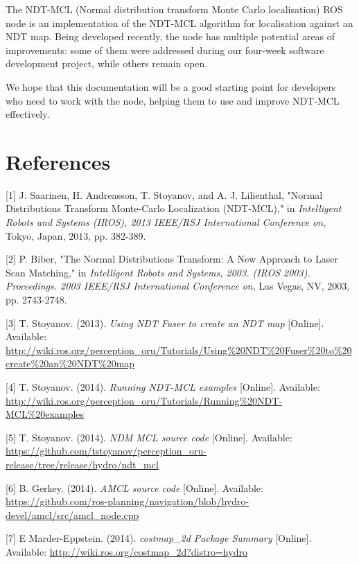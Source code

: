 \documentclass[12pt]{article}
\begin{document}
	The NDT-MCL (Normal distribution transform Monte Carlo localisation) ROS node is an implementation of the NDT-MCL algorithm for localisation against an NDT map. Being developed recently, the node has multiple potential areas of improvements: some of them were addressed during our four-week software development project, while others remain open.

	We hope that this documentation will be a good starting point for developers who need to work with the node, helping them to use and improve NDT-MCL effectively.

	\section{References}
	\label{sec:references}

	[1] J. Saarinen, H. Andreasson, T. Stoyanov, and A. J. Lilienthal, "Normal Distributions Transform Monte-Carlo Localization (NDT-MCL)," in {\it Intelligent Robots and Systems (IROS), 2013 IEEE/RSJ International Conference on}, Tokyo, Japan, 2013, pp. 382-389.

	\setlength{\parskip}{0.25in}

	[2] P. Biber, "The Normal Distributions Transform: A New Approach to Laser Scan Matching," in {\it Intelligent Robots and Systems, 2003. (IROS 2003). Proceedings. 2003 IEEE/RSJ International Conference on}, Las Vegas, NV, 2003, pp. 2743-2748.

	[3] T. Stoyanov. (2013). {\it Using NDT Fuser to create an NDT map} [Online]. Available: \url{http://wiki.ros.org/perception_oru/Tutorials/Using%20NDT%20Fuser%20to%20create%20an%20NDT%20map}

	[4] T. Stoyanov. (2014). {\it Running NDT-MCL examples} [Online]. Available: \url{http://wiki.ros.org/perception_oru/Tutorials/Running%20NDT-MCL%20examples}

	[5] T. Stoyanov. (2014). {\it NDM MCL source code} [Online]. Available: \url{https://github.com/tstoyanov/perception_oru-release/tree/release/hydro/ndt_mcl}

	[6] B. Gerkey. (2014). {\it AMCL source code} [Online]. Available: \url{https://github.com/ros-planning/navigation/blob/hydro-devel/amcl/src/amcl_node.cpp}
	
	[7] E Marder-Eppstein. (2014). {\it costmap\_2d Package Summary} [Online]. Available: \url{http://wiki.ros.org/costmap_2d?distro=hydro}
\end{document}
